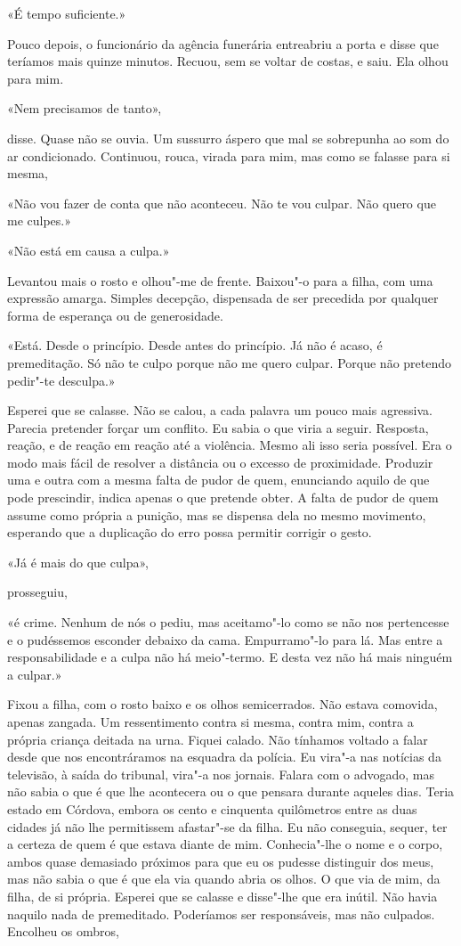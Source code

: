 «É tempo suficiente.»

Pouco depois, o funcionário da agência funerária entreabriu a porta e
disse que teríamos mais quinze minutos. Recuou, sem se voltar de costas,
e saiu. Ela olhou para mim.

«Nem precisamos de tanto»,

disse. Quase não se ouvia. Um sussurro áspero que mal se sobrepunha ao
som do ar condicionado. Continuou, rouca, virada para mim, mas como se
falasse para si mesma,

«Não vou fazer de conta que não aconteceu. Não te vou culpar. Não quero
que me culpes.»

«Não está em causa a culpa.»

Levantou mais o rosto e olhou"-me de frente. Baixou"-o para a filha, com
uma expressão amarga. Simples decepção, dispensada de ser precedida por
qualquer forma de esperança ou de generosidade.

«Está. Desde o princípio. Desde antes do princípio. Já não é acaso, é
premeditação. Só não te culpo porque não me quero culpar. Porque não
pretendo pedir"-te desculpa.»

Esperei que se calasse. Não se calou, a cada palavra um pouco mais
agressiva. Parecia pretender forçar um conflito. Eu sabia o que viria a
seguir. Resposta, reação, e de reação em reação até a violência.
Mesmo ali isso seria possível. Era o modo mais fácil de resolver a
distância ou o excesso de proximidade. Produzir uma e outra com a mesma
falta de pudor de quem, enunciando aquilo de que pode prescindir, indica
apenas o que pretende obter. A falta de pudor de quem assume como
própria a punição, mas se dispensa dela no mesmo movimento, esperando
que a duplicação do erro possa permitir corrigir o gesto.

«Já é mais do que culpa»,

prosseguiu,

«é crime. Nenhum de nós o pediu, mas aceitamo"-lo como se não nos
pertencesse e o pudéssemos esconder debaixo da cama. Empurramo"-lo para
lá. Mas entre a responsabilidade e a culpa não há meio"-termo. E desta
vez não há mais ninguém a culpar.»

Fixou a filha, com o rosto baixo e os olhos semicerrados. Não estava
comovida, apenas zangada. Um ressentimento contra si mesma, contra mim,
contra a própria criança deitada na urna. Fiquei calado. Não tínhamos
voltado a falar desde que nos encontráramos na esquadra da polícia. Eu
vira"-a nas notícias da televisão, à saída do tribunal, vira"-a nos
jornais. Falara com o advogado, mas não sabia o que é que lhe acontecera
ou o que pensara durante aqueles dias. Teria estado em Córdova, embora
os cento e cinquenta quilômetros entre as duas cidades já não lhe
permitissem afastar"-se da filha. Eu não conseguia, sequer, ter a
certeza de quem é que estava diante de mim. Conhecia"-lhe o nome e o
corpo, ambos quase demasiado próximos para que eu os pudesse distinguir
dos meus, mas não sabia o que é que ela via quando abria os olhos. O que
via de mim, da filha, de si própria. Esperei que se calasse e disse"-lhe
que era inútil. Não havia naquilo nada de premeditado. Poderíamos ser
responsáveis, mas não culpados. Encolheu os ombros,

